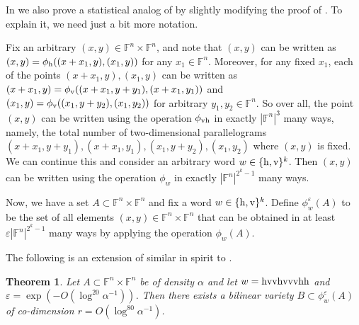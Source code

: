 \documentclass[12pt]{article}
\newcommand{\F}{\mathbb{F}}
\newcommand{\hr}{\textup{h}}
\newcommand{\vr}{\textup{v}}
\newcommand{\eps}{\varepsilon}
\newtheorem{theorem}{Theorem}[section]
\begin{document}
In  we also prove a statistical analog of  by slightly modifying the proof of . To explain it, we need just a bit more notation.

 Fix an arbitrary $(x,y)\in \F^n\times \F^n$, and note that $(x,y)$ can be written as $(x,y) = \phi_\hr((x+x_1,y),(x_1,y))$ for any $x_1\in \F^n$. Moreover, for any fixed $x_1$, each of the points $(x+x_1,y), (x_1,y)$ can be written as $(x+x_1,y) = \phi_\vr((x+x_1,y+y_1),(x+x_1,y_1))$ and $(x_1,y) = \phi_\vr((x_1,y+y_2),(x_1,y_2))$ for arbitrary $y_1,y_2\in \F^n$. So over all, the point $(x,y)$ can be written  using the operation $\phi_{\vr\hr}$ in exactly $|\F^n|^3$ many ways, namely,  the total number of two-dimensional parallelograms $(x+x_1,y+y_1),(x+x_1,y_1),(x_1,y+y_2),(x_1,y_2)$ where $(x,y)$ is fixed. We can continue this and consider an arbitrary word $w\in \{\hr,\vr\}^k$. Then $(x,y)$ can be written using the operation $\phi_w$ in exactly $|\F^n|^{2^k-1}$ many ways.

 Now, we have a set $A\subset \F^n \times \F^n$ and fix a word $w\in \{\hr,\vr\}^k$. Define $\phi_w^\eps(A)$ to be the set of all elements $(x,y)\in  \F^n\times \F^n$ that can be obtained in at least $\eps|\F^n|^{2^k-1}$ many ways by applying the operation $\phi_w(A)$.


The following is an extension of  similar in spirit to .
\begin{theorem}\label{theorem:main2}
	Let $A \subset \F^n \times \F^n$ be of density $\alpha$ and let $w = \hr\vr\vr\hr\vr\vr\vr\hr\hr$ and $\eps = \exp(-O(\log^{20}\alpha^{-1}))$. Then there exists a bilinear variety $B \subset \phi^{\eps}_w(A)$
of co-dimension $r=O(\log^{80}\alpha^{-1})$.
\end{theorem}
\end{document}
